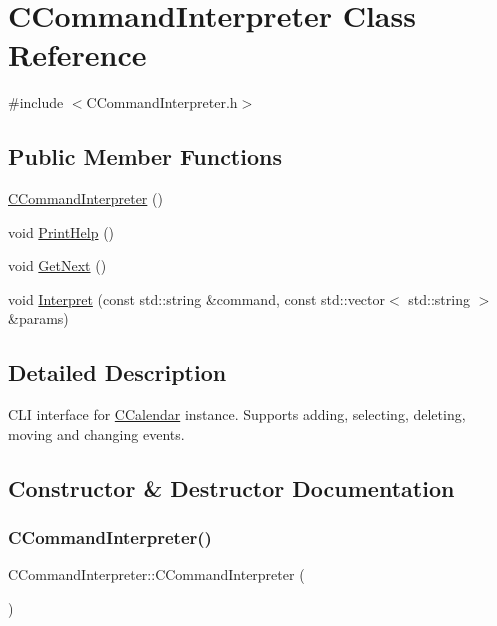 \hypertarget{class_c_command_interpreter}{}\section{C\+Command\+Interpreter Class Reference}
\label{class_c_command_interpreter}


{\ttfamily \#include $<$C\+Command\+Interpreter.\+h$>$}

\subsection*{Public Member Functions}
\begin{DoxyCompactItemize}
\item 
\mbox{\hyperlink{class_c_command_interpreter_a37ef3850d1616cb2f4cde36373aec6da}{C\+Command\+Interpreter}} ()
\item 
void \mbox{\hyperlink{class_c_command_interpreter_a50802d0147f6bb6301308ddd69e9100d}{Print\+Help}} ()
\item 
void \mbox{\hyperlink{class_c_command_interpreter_aaec29447bf0b8574d8324e7c69b59803}{Get\+Next}} ()
\item 
void \mbox{\hyperlink{class_c_command_interpreter_a7efec8fce416d6e12f1ff41b2c0d29ac}{Interpret}} (const std\+::string \&command, const std\+::vector$<$ std\+::string $>$ \&params)
\end{DoxyCompactItemize}


\subsection{Detailed Description}
C\+LI interface for \mbox{\hyperlink{class_c_calendar}{C\+Calendar}} instance. Supports adding, selecting, deleting, moving and changing events. 

\subsection{Constructor \& Destructor Documentation}
\mbox{\label{class_c_command_interpreter_a37ef3850d1616cb2f4cde36373aec6da}} 
\subsubsection{\texorpdfstring{C\+Command\+Interpreter()}{CCommandInterpreter()}}
{\footnotesize\ttfamily C\+Command\+Interpreter\+::\+C\+Command\+Interpreter (\begin{DoxyParamCaption}{ }\end{DoxyParamCaption})}



